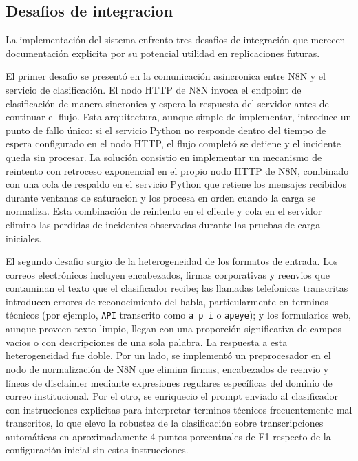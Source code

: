 \subsection{Desafios de integracion}

La implementación del sistema enfrento tres desafios de integración que merecen documentación explicita por su potencial utilidad en replicaciones futuras.

El primer desafio se presentó en la comunicación asincronica entre N8N y el servicio de clasificación. El nodo HTTP de N8N invoca el endpoint de clasificación de manera sincronica y espera la respuesta del servidor antes de continuar el flujo. Esta arquitectura, aunque simple de implementar, introduce un punto de fallo único: si el servicio Python no responde dentro del tiempo de espera configurado en el nodo HTTP, el flujo completó se detiene y el incidente queda sin procesar. La solución consistio en implementar un mecanismo de reintento con retroceso exponencial en el propio nodo HTTP de N8N, combinado con una cola de respaldo en el servicio Python que retiene los mensajes recibidos durante ventanas de saturacion y los procesa en orden cuando la carga se normaliza. Esta combinación de reintento en el cliente y cola en el servidor elimino las perdidas de incidentes observadas durante las pruebas de carga iniciales.

El segundo desafio surgio de la heterogeneidad de los formatos de entrada. Los correos electrónicos incluyen encabezados, firmas corporativas y reenvios que contaminan el texto que el clasificador recibe; las llamadas telefonicas transcritas introducen errores de reconocimiento del habla, particularmente en terminos técnicos (por ejemplo, \texttt{API} transcrito como \texttt{a p i} o \texttt{apeye}); y los formularios web, aunque proveen texto limpio, llegan con una proporción significativa de campos vacios o con descripciones de una sola palabra. La respuesta a esta heterogeneidad fue doble. Por un lado, se implementó un preprocesador en el nodo de normalización de N8N que elimina firmas, encabezados de reenvio y líneas de disclaimer mediante expresiones regulares específicas del dominio de correo institucional. Por el otro, se enriquecio el prompt enviado al clasificador con instrucciones explicitas para interpretar terminos técnicos frecuentemente mal transcritos, lo que elevo la robustez de la clasificación sobre transcripciones automáticas en aproximadamente 4 puntos porcentuales de F1 respecto de la configuración inicial sin estas instrucciones.

